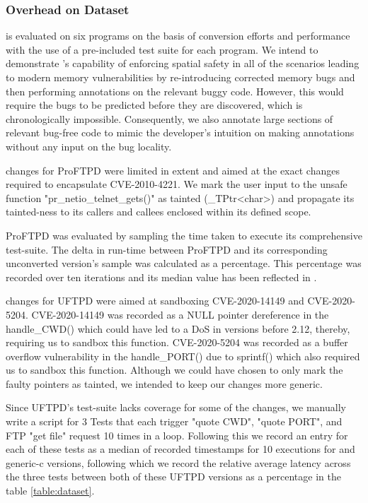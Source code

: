 \subsubsection{Overhead on Dataset}
\label{subsec:programoverhead}



\systemname is evaluated on six programs on the basis of conversion efforts and performance with the use of a pre-included test suite for each program. We intend to demonstrate \systemname's capability of enforcing spatial safety in all of the scenarios leading to modern memory vulnerabilities by re-introducing corrected memory bugs and then performing \systemname annotations on the relevant buggy code. However, this would require the bugs to be predicted before they are discovered, which is chronologically impossible. Consequently, we also annotate large sections of relevant bug-free code to mimic the developer's intuition on making \systemname annotations without any input on the bug locality. 

\systemname changes for ProFTPD were limited in extent and aimed at the exact changes required to encapsulate CVE-2010-4221. We mark the user input to the unsafe function "pr\_netio\_telnet\_gets()" as tainted (\_TPtr<char>) and propagate its tainted-ness to its callers and callees enclosed within its defined scope.

ProFTPD was evaluated by sampling the time taken to execute its comprehensive test-suite. The delta in run-time between \systemname ProFTPD and its corresponding unconverted version's sample was calculated as a percentage. This percentage was recorded over ten iterations and its median value has been reflected in .

\systemname changes for UFTPD were aimed at sandboxing CVE-2020-14149 and CVE-2020-5204. CVE-2020-14149 was recorded as a NULL pointer dereference in the handle\_CWD() which could have led to a DoS in versions before 2.12, thereby, requiring us to sandbox this function. CVE-2020-5204 was recorded as a buffer overflow vulnerability in the handle\_PORT() due to sprintf() which also required us to sandbox this function. Although we could have chosen to only mark the faulty pointers as tainted, we intended to keep our changes more generic.

Since UFTPD's test-suite lacks coverage for some of the \systemname changes, we manually write a script for 3 Tests that each trigger "quote CWD", "quote PORT", and FTP "get file" request 10 times in a loop. Following this we record an entry for each of these tests as a median of recorded timestamps for 10 executions for \systemname and generic-c versions, following which we record the relative average latency across the three tests between both of these UFTPD versions as a percentage in the table \ref{table:dataset}.    

